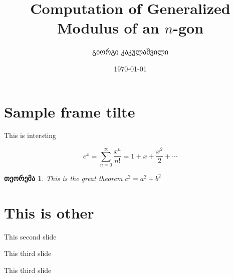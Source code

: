 \documentclass[12pt]{article}
\newcommand{\slidetitle}[1]{\section*{#1}}
\theoremstyle{colored}
\newtheorem{theorem}{თეორემა}
\newenvironment{slide}[1]{\newpage #1}{\vfill\rightline{\thepage}}
\begin{document}
\title{\Large\color{primary} Computation of Generalized Modulus of an $n$-gon}
\author{\normalsize გიორგი კაკულაშვილი}
\date{\normalsize \today}
\maketitle




\begin{slide}
    \slidetitle{Sample frame tilte}

    This is intersting

    \[
        e^x = \sum_{n=0}^{\infty} \frac{x^n}{n!} = 1 + x + \frac{x^2}{2} + \cdots
    \]

    \begin{theorem}
        This is the great theorem $c^2=a^2+b^2$
    \end{theorem}

\end{slide}


\begin{slide}
    \slidetitle{This is other}
    This second slide 

    
\end{slide}

\begin{slide}
    This third slide
\end{slide}


\begin{slide}
    This third slide
\end{slide}
\end{document}

